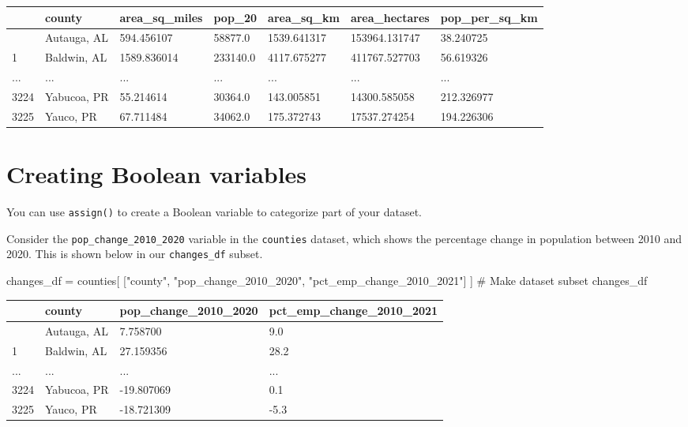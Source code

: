 \documentclass[
  letterpaper,
  DIV=11,
  numbers=noendperiod]{scrreprt}
\newenvironment{Shaded}{\begin{snugshade}}{\end{snugshade}}
\newcommand{\CommentTok}[1]{\textcolor[rgb]{0.37,0.37,0.37}{#1}}
\newcommand{\NormalTok}[1]{\textcolor[rgb]{0.00,0.23,0.31}{#1}}
\newcommand{\OperatorTok}[1]{\textcolor[rgb]{0.37,0.37,0.37}{#1}}
\newcommand{\StringTok}[1]{\textcolor[rgb]{0.13,0.47,0.30}{#1}}
\begin{document}
\begin{tcolorbox}
\begin{longtable}[]{@{}lllllll@{}}
\toprule\noalign{}
& county & area\_sq\_miles & pop\_20 & area\_sq\_km & area\_hectares &
pop\_per\_sq\_km \\
\midrule\noalign{}
\endhead
\bottomrule\noalign{}
\endlastfoot
0 & Autauga, AL & 594.456107 & 58877.0 & 1539.641317 & 153964.131747 &
38.240725 \\
1 & Baldwin, AL & 1589.836014 & 233140.0 & 4117.675277 & 411767.527703 &
56.619326 \\
... & ... & ... & ... & ... & ... & ... \\
3224 & Yabucoa, PR & 55.214614 & 30364.0 & 143.005851 & 14300.585058 &
212.326977 \\
3225 & Yauco, PR & 67.711484 & 34062.0 & 175.372743 & 17537.274254 &
194.226306 \\
\end{longtable}

\end{tcolorbox}

\section{Creating Boolean variables}\label{creating-boolean-variables}

You can use \texttt{assign()} to create a Boolean variable to categorize
part of your dataset.

Consider the \texttt{pop\_change\_2010\_2020} variable in the
\texttt{counties} dataset, which shows the percentage change in
population between 2010 and 2020. This is shown below in our
\texttt{changes\_df} subset.

\begin{Shaded}
\begin{Highlighting}[]
\NormalTok{changes\_df }\OperatorTok{=}\NormalTok{ counties[}
\NormalTok{    [}\StringTok{"county"}\NormalTok{, }\StringTok{"pop\_change\_2010\_2020"}\NormalTok{, }\StringTok{"pct\_emp\_change\_2010\_2021"}\NormalTok{]}
\NormalTok{]  }\CommentTok{\# Make dataset subset}
\NormalTok{changes\_df}
\end{Highlighting}
\end{Shaded}

\begin{longtable}[]{@{}llll@{}}
\toprule\noalign{}
& county & pop\_change\_2010\_2020 & pct\_emp\_change\_2010\_2021 \\
\midrule\noalign{}
\endhead
\bottomrule\noalign{}
\endlastfoot
0 & Autauga, AL & 7.758700 & 9.0 \\
1 & Baldwin, AL & 27.159356 & 28.2 \\
... & ... & ... & ... \\
3224 & Yabucoa, PR & -19.807069 & 0.1 \\
3225 & Yauco, PR & -18.721309 & -5.3 \\
\end{longtable}
\end{document}
